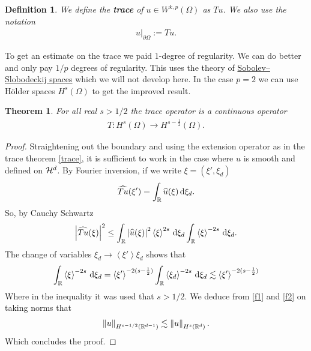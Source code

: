 \documentclass[12pt]{article}
\newtheorem{theorem}{Theorem}
\newtheorem{definition}{Definition}
\theoremstyle{remark}
\newcommand{\br}[1]{\left\langle#1\right\rangle} \newcommand{\set}[1]{\left\{#1\right\}} \newcommand{\qp}[1]{\left(#1\right)}\newcommand{\qb}[1]{\left[#1\right]}
\renewcommand{\norm}[1]{\left\lVert #1 \right\rVert}\renewcommand{\abs}[1]{\left| #1 \right|}
\renewcommand{\d}{\,\mathrm{d}}
\newcommand\restr[2]{\left.#1\right|_{#2}}
\begin{document}
\begin{definition}
	We define the \textbf{trace} of $u \in W^{k,p}(\Omega)$ as $Tu$. We also use the notation
	\begin{align*}
		\restr{u}{\partial \Omega}:= Tu.
	\end{align*}
\end{definition}
To get an estimate on the trace we paid $1$-degree of regularity. We can do better and only pay ${1}/{p}$ degrees of regularity. This uses the theory of \href{https://en.wikipedia.org/wiki/Trace_operator#For_p_=_1:~:text=%5Bedit%5D-,A%20more,-concrete%20representation%20of}{Sobolev–Slobodeckij spaces} which we will not develop here. In the case $p=2$ we can use Hölder spaces $H^s(\Omega)$ to get the improved result.
\begin{theorem}
	For all real $s> 1 /2$ the trace operator is a continuous operator
	\begin{align*}
		T: H^s(\Omega) \to H^{s -\frac{1}{2}}(\Omega).
	\end{align*}
\end{theorem}
\begin{proof}
	Straightening out the boundary and using the extension operator as in the trace theorem \ref{trace}, it is sufficient to work in the case where $u$ is smooth and defined on  $\mathcal{H}^{d}$.  By Fourier inversion, if we write $\xi=(\xi',\xi _d) $
	\begin{align*}
		\wh{Tu}(\xi ')=\int_{\R}\wh{u}(\xi) \d \xi _d .
	\end{align*}
	So, by Cauchy Schwartz
	\begin{align}\label{f1}
		\abs{\wh{Tu}(\xi )}^2\leq \int_{\R}\abs{\wh{u}(\xi)}^2\br{\xi }^{2s} \d \xi _d \int_{\R}\br{\xi }^{-2s} \d \xi _d.
	\end{align}
	The change of variables $\xi _d \to \br{\xi '}\xi _d$ shows that
	\begin{align}\label{f2}
		\int_{\R}\br{\xi }^{-2s} \d \xi _d=\br{\xi' }^{-2(s-\frac{1}{2})} \int_{\R}\br{\xi _d}^{-2s}\d \xi _d\lesssim  \br{\xi' }^{-2(s-\frac{1}{2})}
	\end{align}
	Where in the inequality it was used that $s> 1 /2$.     We deduce from \eqref{f1} and \eqref{f2} on taking norms that
	\begin{align*}
		\norm{u}_{H^{s-1 /2}(\R^{d-1})} \lesssim  \norm{u}_{H^s(\R^d)}.
	\end{align*}
	Which concludes the proof.
\end{proof}
\end{document}
